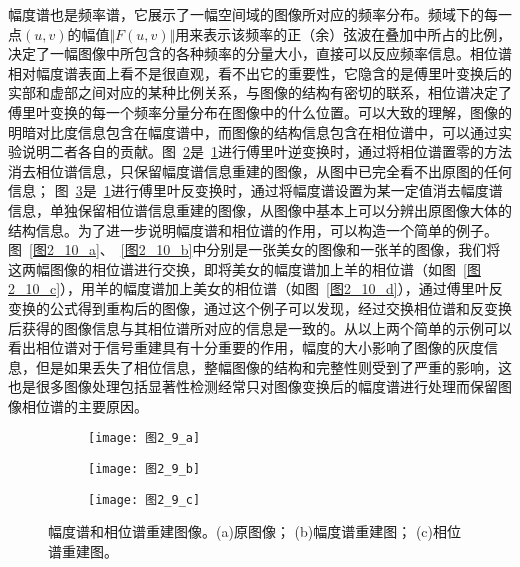 幅度谱也是频率谱，它展示了一幅空间域的图像所对应的频率分布。频域下的每一点$(u,v)$的幅值$\Vert F(u,v)\Vert$用来表示该频率的正（余）弦波在叠加中所占的比例，决定了一幅图像中所包含的各种频率的分量大小，直接可以反应频率信息。相位谱相对幅度谱表面上看不是很直观，看不出它的重要性，它隐含的是傅里叶变换后的实部和虚部之间对应的某种比例关系，与图像的结构有密切的联系，相位谱决定了傅里叶变换的每一个频率分量分布在图像中的什么位置。可以大致的理解，图像的明暗对比度信息包含在幅度谱中，而图像的结构信息包含在相位谱中，可以通过实验说明二者各自的贡献。图~\ref{图2_9_b}是~\ref{图2_9_a}进行傅里叶逆变换时，通过将相位谱置零的方法消去相位谱信息，只保留幅度谱信息重建的图像，从图中已完全看不出原图的任何信息； 图~\ref{图2_9_c}是~\ref{图2_9_a}进行傅里叶反变换时，通过将幅度谱设置为某一定值消去幅度谱信息，单独保留相位谱信息重建的图像，从图像中基本上可以分辨出原图像大体的结构信息。为了进一步说明幅度谱和相位谱的作用，可以构造一个简单的例子。图~\ref{图2_10_a}、~\ref{图2_10_b}中分别是一张美女的图像和一张羊的图像，我们将这两幅图像的相位谱进行交换，即将美女的幅度谱加上羊的相位谱（如图~\ref{图2_10_c}），用羊的幅度谱加上美女的相位谱（如图~\ref{图2_10_d}），通过傅里叶反变换的公式得到重构后的图像，通过这个例子可以发现，经过交换相位谱和反变换后获得的图像信息与其相位谱所对应的信息是一致的。从以上两个简单的示例可以看出相位谱对于信号重建具有十分重要的作用，幅度的大小影响了图像的灰度信息，但是如果丢失了相位信息，整幅图像的结构和完整性则受到了严重的影响，这也是很多图像处理包括显著性检测经常只对图像变换后的幅度谱进行处理而保留图像相位谱的主要原因。
\begin{figure}[h]
  \centering%
  \begin{subfigure}{3cm}
    \texttt{[image: 图2\_9\_a]}
    \caption{}
    \label{图2_9_a}
  \end{subfigure}
  \hspace{4em}%
  \begin{subfigure}{0.2\textwidth}
    \texttt{[image: 图2\_9\_b]}
    \caption{}
    \label{图2_9_b}
  \end{subfigure}
  \hspace{4em}%
  \begin{subfigure}{0.25\textwidth}
    \texttt{[image: 图2\_9\_c]}
    \caption{}
    \label{图2_9_c}
  \end{subfigure}
  \caption{幅度谱和相位谱重建图像。(a)原图像； (b)幅度谱重建图； (c)相位谱重建图。}
  \label{图2_9}
\end{figure}
